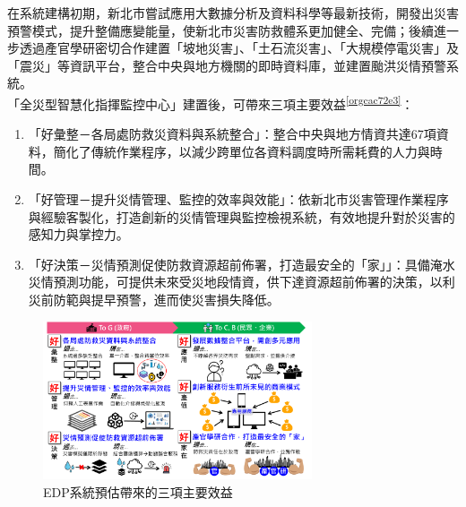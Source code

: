 \documentclass[a4paper,12pt]{article}
\begin{document}
\begin{enumerate}
\begin{enumerate}
在系統建構初期，新北市嘗試應用大數據分析及資料科學等最新技術，開發出災害預警模式，提升整備應變能量，使新北市災害防救體系更加健全、完備；後續進一步透過產官學研密切合作建置「坡地災害」、「土石流災害」、「大規模停電災害」及「震災」等資訊平台，整合中央與地方機關的即時資料庫，並建置颱洪災情預警系統。\\

「全災型智慧化指揮監控中心」建置後，可帶來三項主要效益\textsuperscript{\ref{orgcac72e3}}：\\
\begin{enumerate}
\item 「好彙整－各局處防救災資料與系統整合」：整合中央與地方情資共達67項資料，簡化了傳統作業程序，以減少跨單位各資料調度時所需耗費的人力與時間。\\
\item 「好管理－提升災情管理、監控的效率與效能」：依新北市災害管理作業程序與經驗客製化，打造創新的災情管理與監控檢視系統，有效地提升對於災害的感知力與掌控力。\\
\item 「好決策－災情預測促使防救資源超前佈署，打造最安全的「家」」：具備淹水災情預測功能，可提供未來受災地段情資，供下達資源超前佈署的決策，以利災前防範與提早預警，進而使災害損失降低。\\
\end{enumerate}

\begin{figure}[htbp]
\centering
\includegraphics[width=300]{images/aaron1.png}
\caption{\label{fig:FigName}EDP系統預估帶來的三項主要效益}
\end{figure}


\end{enumerate}
\end{enumerate}
\end{document}
